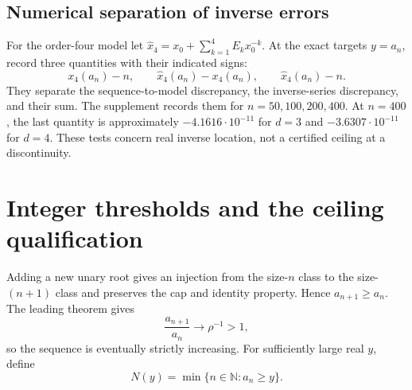 \documentclass[11pt]{article}
\theoremstyle{definition}\newtheorem{definition}[theorem]{Definition}
\theoremstyle{remark}\newtheorem{remark}[theorem]{Remark}
\newcommand{\N}{\mathbb N}
\begin{document}
\subsection{Numerical separation of inverse errors}
For the order-four model let
$\widehat x_4=x_0+\sum_{k=1}^4E_kx_0^{-k}$.
At the exact targets $y=a_n$, record three quantities with their indicated signs:
\begin{equation}
 x_4(a_n)-n,\qquad
 \widehat x_4(a_n)-x_4(a_n),\qquad
 \widehat x_4(a_n)-n.
 \label{bit:eq:inverseerrors}
\end{equation}
They separate the sequence-to-model discrepancy, the inverse-series discrepancy, and their sum. The supplement records them for $n=50,100,200,400$. At $n=400$, the last quantity is approximately $-4.1616\cdot10^{-11}$ for $d=3$ and $-3.6307\cdot10^{-11}$ for $d=4$. These tests concern real inverse location, not a certified ceiling at a discontinuity.

\section{Integer thresholds and the ceiling qualification}
\label{bit:sec:threshold}
Adding a new unary root gives an injection from the size-$n$ class to the size-$(n+1)$ class and preserves the cap and identity property. Hence $a_{n+1}\ge a_n$. The leading theorem gives
\begin{equation}
 \frac{a_{n+1}}{a_n}\longrightarrow\rho^{-1}>1,
 \label{bit:eq:ratio}
\end{equation}
so the sequence is eventually strictly increasing. For sufficiently large real $y$, define
\begin{equation}
 N(y)=\min\{n\in\N:a_n\ge y\}.
 \label{bit:eq:threshold}
\end{equation}
\end{document}
